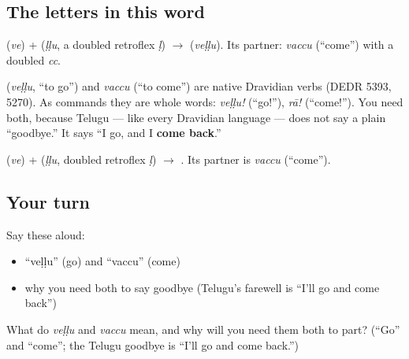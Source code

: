 \subsection*{The letters in this word}
\textbf{} (\emph{ve}) + \textbf{} (\emph{ḷḷu}, a doubled retroflex \textbf{} \emph{ḷ}) $\to$ \textbf{} (\emph{veḷḷu}). Its partner: \emph{vaccu} (\textquotedblleft{}come\textquotedblright{}) with a doubled \emph{cc}.

\begin{cousinweb}
\textbf{} (\emph{veḷḷu}, \textquotedblleft{}to go\textquotedblright{}) and \emph{vaccu} (\textquotedblleft{}to come\textquotedblright{}) are native Dravidian verbs (DEDR 5393, 5270). As commands they are whole words: \emph{veḷḷu!} (\textquotedblleft{}go!\textquotedblright{}), \emph{rā!} (\textquotedblleft{}come!\textquotedblright{}). You need both, because Telugu — like every Dravidian language — does not say a plain \textquotedblleft{}goodbye.\textquotedblright{} It says \textquotedblleft{}I go, and I \textbf{come back}.\textquotedblright{}
\end{cousinweb}

\begin{sounds}
 (\emph{ve}) +  (\emph{ḷḷu}, doubled retroflex  \emph{ḷ}) $\to$ . Its partner is \emph{vaccu} (“come”).
\end{sounds}

\subsection*{Your turn}
Say these aloud:

\begin{itemize}
\raggedright
  \item \textquotedblleft{}veḷḷu\textquotedblright{} (go) and \textquotedblleft{}vaccu\textquotedblright{} (come)
  \item why you need both to say goodbye (Telugu's farewell is \textquotedblleft{}I'll go and come back\textquotedblright{})
\end{itemize}

\begin{tcolorbox}[breakable,colback=teal!4,colframe=teal!35!black,title={Before you move on}]
What do \emph{veḷḷu} and \emph{vaccu} mean, and why will you need them both to part? (\textquotedblleft{}Go\textquotedblright{} and \textquotedblleft{}come\textquotedblright{}; the Telugu goodbye is \textquotedblleft{}I'll go and come back.\textquotedblright{})
\end{tcolorbox}
